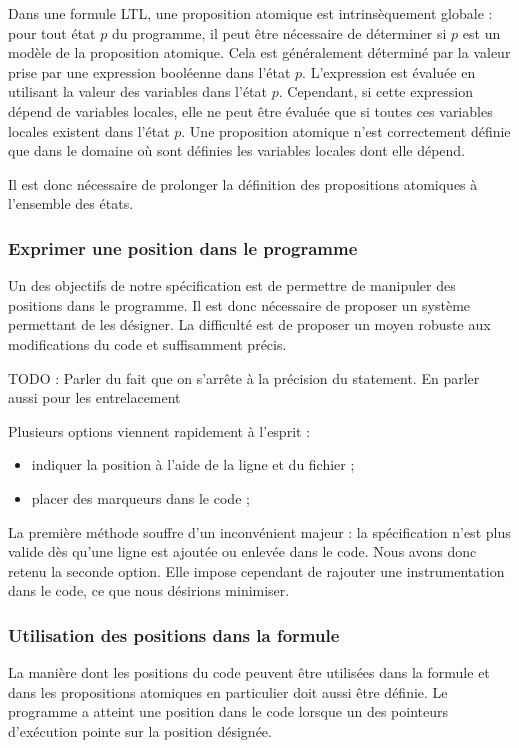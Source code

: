 Dans une formule LTL, une proposition atomique est intrinsèquement
globale : pour tout état \(p\) du programme, il peut être nécessaire de
déterminer si \(p\) est un modèle de la proposition atomique. Cela est
généralement déterminé par la valeur prise par une expression booléenne
dans l'état \(p\). L'expression est évaluée en utilisant la valeur des
variables dans l'état \(p\). Cependant, si cette expression dépend de
variables locales, elle ne peut être évaluée que si toutes ces variables
locales existent dans l'état \(p\). Une proposition atomique n'est
correctement définie que dans le domaine où sont définies les variables
locales dont elle dépend.

Il est donc nécessaire de prolonger la définition des propositions
atomiques à l'ensemble des états.

\subsubsection{Exprimer une position dans le programme}

Un des objectifs de notre spécification est de permettre de manipuler
des positions dans le programme. Il est donc nécessaire de proposer un
système permettant de les désigner. La difficulté est de proposer un
moyen robuste aux modifications du code et suffisamment précis.

TODO : Parler du fait que on s'arrête à la précision du statement. En
parler aussi pour les entrelacement

Plusieurs options viennent rapidement à l'esprit :

\begin{itemize}
\item
  indiquer la position à l'aide de la ligne et du fichier ;
\item
  placer des marqueurs dans le code ;
\end{itemize}

La première méthode souffre d'un inconvénient majeur : la spécification
n'est plus valide dès qu'une ligne est ajoutée ou enlevée dans le code.
Nous avons donc retenu la seconde option. Elle impose cependant de
rajouter une instrumentation dans le code, ce que nous désirions
minimiser.

\subsubsection{Utilisation des positions dans la formule}

La manière dont les positions du code peuvent être utilisées dans la
formule et dans les propositions atomiques en particulier doit aussi
être définie. Le programme a atteint une position dans le code lorsque
un des pointeurs d'exécution pointe sur la position désignée.

